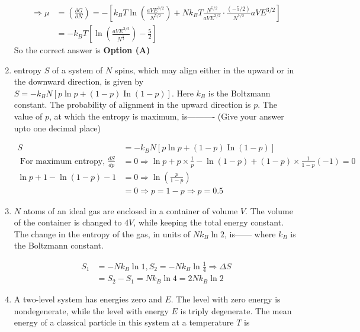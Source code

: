 \begin{enumerate}
\begin{answer}
\begin{align*}
		\Rightarrow \mu&=\left(\frac{\partial G}{\partial N}\right)=-\left[k_{B} T \ln \left(\frac{a V E^{3 / 2}}{N^{5 / 2}}\right)+N k_{B} T \frac{N^{5 / 2}}{a V E^{3 / 2}} \cdot \frac{(-5 / 2)}{N^{7 / 2}} a V E^{3 / 2}\right]\\&=-k_{B} T\left[\ln \left(\frac{a V E^{3 / 2}}{N^{\frac{5}{2}}}\right)-\frac{5}{2}\right]
		\end{align*}
		So the correct answer is \textbf{Option (A)}
	\end{answer}	
	\item entropy $S$ of a system of $N$ spins, which may align either in the upward or in the downward direction, is given by $S=-k_{B} N[p \ln p+(1-p) \operatorname{In}(1-p)] .$ Here $k_{B}$ is the Boltzmann constant. The probability of alignment in the upward direction is $p$. The value of $p$, at which the entropy is maximum, is---------- (Give your answer upto one decimal place)
	{}
	\begin{answer}
		\begin{align*}
		S&=-k_{B} N[p \ln p+(1-p) \operatorname{In}(1-p)]\\
		\text{	For maximum entropy, }\frac{d S}{d p}&=0 \Rightarrow \ln p+p \times \frac{1}{p}-\ln (1-p)+(1-p) \times \frac{1}{1-p}(-1)=0\\
		\ln p+1-\ln (1-p)-1&=0 \Rightarrow \ln \left(\frac{p}{1-p}\right)\\&=0 \Rightarrow p=1-p \Rightarrow p=0.5
		\end{align*}
	\end{answer}
	\item 	$N$ atoms of an ideal gas are enclosed in a container of volume $V$. The volume of the container is changed to $4 V$, while keeping the total energy constant. The change in the entropy of the gas, in units of $N k_{B} \ln 2$, is------ where $k_{B}$ is the Boltzmann constant.
	{}
	\begin{answer}
		\begin{align*}
		S_{1}&=-N k_{B} \ln 1, S_{2}=-N k_{B} \ln \frac{1}{4} \Rightarrow \Delta S\\&=S_{2}-S_{1}=N k_{B} \ln 4=2 N k_{B} \ln 2
		\end{align*}
	\end{answer}
	\item A two-level system has energies zero and $E$. The level with zero energy is nondegenerate, while the level with energy $E$ is triply degenerate. The mean energy of a classical particle in this system at a temperature $T$ is
	{}

\end{enumerate}
